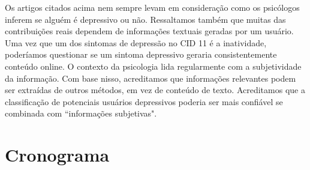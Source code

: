 \documentclass[11pt, notitlepage]{article} %
\begin{document}
Os artigos citados acima nem sempre levam em consideração como os psicólogos inferem se alguém é depressivo ou não.
Ressaltamos também que muitas das contribuições reais dependem de informações textuais geradas por um usuário. Uma vez que um dos sintomas de depressão no CID 11 é a inatividade, poderíamos questionar se um sintoma depressivo geraria consistentemente conteúdo online. O contexto da psicologia lida regularmente com a subjetividade da informação. Com base nisso, acreditamos que informações relevantes podem ser extraídas de outros métodos, em vez de conteúdo de texto. Acreditamos que a classificação de potenciais usuários depressivos poderia ser mais confiável se combinada com ``informações subjetivas".

\section*{Cronograma}


\newpage
\end{document}
